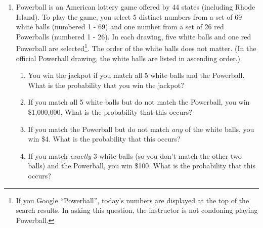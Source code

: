 \documentclass[12pt]{article}
\begin{document}
\begin{enumerate}
\item Powerball is an American lottery game offered by 44 states (including Rhode Island). To play the game, you select 5 distinct numbers from a set of 69 white balls (numbered 1 - 69) and one number from a set of 26 red Powerballs (numbered 1 - 26). In each drawing, five white balls and one red Powerball are selected\footnote{If you Google ``Powerball'', today's numbers are displayed at the top of the search results. In asking this question, the instructor is not condoning playing Powerball. }. The order of the white balls does not matter. (In the official Powerball drawing, the white balls are listed in ascending order.) 
\begin{enumerate}
\item You win the jackpot if you match all 5 white balls and the Powerball. What is the probability that you win the jackpot?
\item If you match all 5 white balls but do not match the Powerball, you win \$1,000,000. What is the probability that this occurs?
\item If you match the Powerball but do not match \emph{any} of the white balls, you win \$4. What is the probability that this occurs?
\item If you match \emph{exactly} 3 white balls (so you don't match the other two balls) and the Powerball, you win \$100. What is the probability that this occurs?
\end{enumerate}

\end{enumerate}
\end{document}
